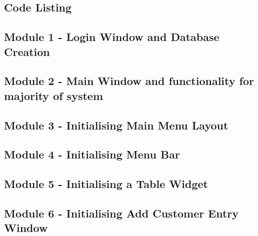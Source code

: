 \begin{landscape}
\section{Code Listing}
\begin{scriptsize}

\subsection{Module 1 - Login Window and Database Creation} \label{ssec:LoginDB.py}


\subsection{Module 2 - Main Window and functionality for majority of system} \label{ssec:MainMenu.py}


\subsection{Module 3 - Initialising Main Menu Layout}


\subsection{Module 4 - Initialising Menu Bar}


\subsection{Module 5 - Initialising a Table Widget}

 \label{ssec:TableWidget.py}

\subsection{Module 6 - Initialising Add Customer Entry Window}

 \label{ssec:AddEntryWindow.py}


\end{scriptsize}
\end{landscape}
